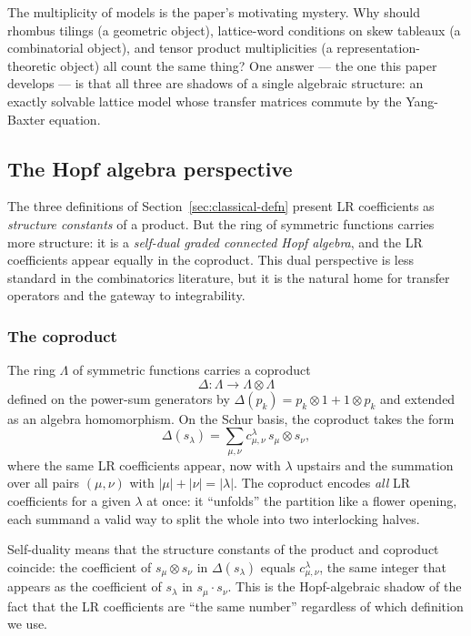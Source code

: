 The multiplicity of models is the paper's motivating mystery.  Why
should rhombus tilings (a geometric object), lattice-word conditions
on skew tableaux (a combinatorial object), and tensor product
multiplicities (a representation-theoretic object) all count the same
thing?  One answer --- the one this paper develops --- is that all
three are shadows of a single algebraic structure: an exactly solvable
lattice model whose transfer matrices commute by the Yang-Baxter
equation.

\subsection{The Hopf algebra perspective}
\label{sec:classical-hopf}

The three definitions of Section~\ref{sec:classical-defn} present LR
coefficients as \emph{structure constants} of a product.  But the ring
of symmetric functions carries more structure: it is a
\emph{self-dual graded connected Hopf algebra}, and the LR
coefficients appear equally in the coproduct.  This dual perspective
is less standard in the combinatorics literature, but it is the
natural home for transfer operators and the gateway to integrability.

\subsubsection*{The coproduct}

The ring $\Lambda$ of symmetric functions carries a coproduct
\[
  \Delta \colon \Lambda \to \Lambda \otimes \Lambda
\]
defined on the power-sum generators by $\Delta(p_k) = p_k \otimes 1 +
1 \otimes p_k$ and extended as an algebra homomorphism.  On the Schur
basis, the coproduct takes the form
\begin{equation}
\label{eq:coproduct}
  \Delta(s_\lambda) = \sum_{\mu,\nu} c^{\lambda}_{\mu,\nu}\, s_\mu
  \otimes s_\nu,
\end{equation}
where the same LR coefficients appear, now with $\lambda$ upstairs
and the summation over all pairs $(\mu, \nu)$ with $|\mu| + |\nu| =
|\lambda|$.  The coproduct encodes \emph{all} LR coefficients for a
given $\lambda$ at once: it ``unfolds'' the partition like a flower
opening, each summand a valid way to split the whole into two
interlocking halves.

Self-duality means that the structure constants of the product and
coproduct coincide: the coefficient of $s_\mu \otimes s_\nu$ in
$\Delta(s_\lambda)$ equals $c^\lambda_{\mu,\nu}$, the same integer
that appears as the coefficient of $s_\lambda$ in $s_\mu \cdot s_\nu$.
This is the Hopf-algebraic shadow of the fact that the LR
coefficients are ``the same number'' regardless of which definition we
use.


